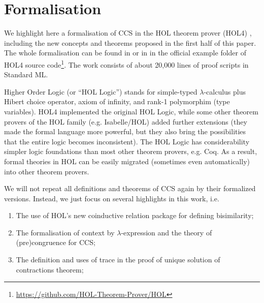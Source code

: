 \section{Formalisation}

We highlight here a formalisation of CCS
in the HOL theorem
prover (HOL4) \cite{slind2008brief},
including the new concepts and theorems proposed in the first half of
this paper.
The whole formalisation can be found 
in \cite{Tian:2017wrba}  or in 
 in the official example folder of HOL4 source
code\footnote{\url{https://github.com/HOL-Theorem-Prover/HOL}}. The
work consists of about 20,000 lines of proof scripts in Standard ML.

Higher Order Logic (or ``HOL Logic'') \cite{hollogic} stands for simple-typed $\lambda$-calculus plus Hibert
choice operator, axiom of infinity, and rank-1 polymorphim (type
variables). HOL4 implemented the original HOL Logic, while
some other theorem provers of the HOL family (e.g. Isabelle/HOL) added
further extensions (they made the formal language more powerful,
but they also bring the possibilities that the entire logic becomes inconsistent).
The HOL Logic has considerability simpler logic
foundations than most other theorem provers, e.g. Coq. As a result,
formal theories in HOL can be easily migrated (sometimes even
automatically) into other theorem provers.

We will not repeat all definitions and theorems of CCS again by their
formalized versions. Instead, we just focus on several highlights in
this work, i.e.
\begin{enumerate}
\item The use of HOL's new coinductive relation package for defining bisimilarity;
\item The formalisation of context by $\lambda$-expression and the theory of
  (pre)congruence for CCS;
\item The definition and uses of trace in the proof of unique solution of
  contractions theorem;
\end{enumerate}

